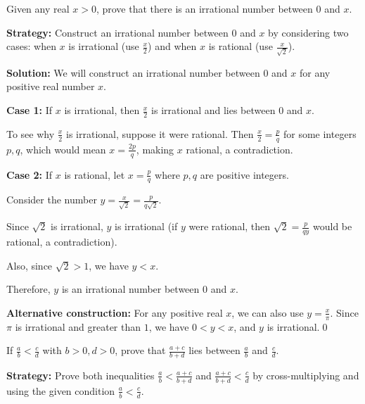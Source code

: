 \begin{problembox}
\begin{problemstatement}
Given any real $x > 0$, prove that there is an irrational number between $0$ and $x$.
\end{problemstatement}
\end{problembox}

\noindent\textbf{Strategy:} Construct an irrational number between $0$ and $x$ by considering two cases: when $x$ is irrational (use $\frac{x}{2}$) and when $x$ is rational (use $\frac{x}{\sqrt{2}}$).

\bigskip\noindent\textbf{Solution:}
We will construct an irrational number between $0$ and $x$ for any positive real number $x$.

\textbf{Case 1:} If $x$ is irrational, then $\frac{x}{2}$ is irrational and lies between $0$ and $x$.

To see why $\frac{x}{2}$ is irrational, suppose it were rational. Then $\frac{x}{2} = \frac{p}{q}$ for some integers $p, q$, which would mean $x = \frac{2p}{q}$, making $x$ rational, a contradiction.

\textbf{Case 2:} If $x$ is rational, let $x = \frac{p}{q}$ where $p, q$ are positive integers.

Consider the number $y = \frac{x}{\sqrt{2}} = \frac{p}{q\sqrt{2}}$.

Since $\sqrt{2}$ is irrational, $y$ is irrational (if $y$ were rational, then $\sqrt{2} = \frac{p}{qy}$ would be rational, a contradiction).

Also, since $\sqrt{2} > 1$, we have $y < x$.

Therefore, $y$ is an irrational number between $0$ and $x$.

\textbf{Alternative construction:}
For any positive real $x$, we can also use $y = \frac{x}{\pi}$. Since $\pi$ is irrational and greater than $1$, we have $0 < y < x$, and $y$ is irrational.\qed


\begin{problembox}
\begin{problemstatement}
If $\frac{a}{b} < \frac{c}{d}$ with $b > 0, d > 0$, prove that $\frac{a + c}{b + d}$ lies between $\frac{a}{b}$ and $\frac{c}{d}$.
\end{problemstatement}
\end{problembox}

\noindent\textbf{Strategy:} Prove both inequalities $\frac{a}{b} < \frac{a + c}{b + d}$ and $\frac{a + c}{b + d} < \frac{c}{d}$ by cross-multiplying and using the given condition $\frac{a}{b} < \frac{c}{d}$.

